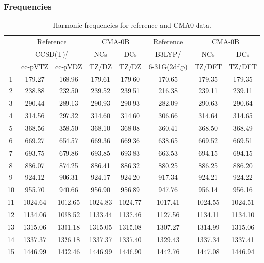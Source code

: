 \documentclass[10pt,oneside]{article}
\begin{document}
\subsubsection*{Frequencies}
\begin{table}[h!]
\centering
\caption{Harmonic frequencies for reference and CMA0 data.}
\begin{tabular}{cccccccc}
\toprule
{} & \multicolumn{2}{c}{Reference} & \multicolumn{2}{c}{CMA-0B} &    Reference & \multicolumn{2}{c}{CMA-0B} \\
{} & \multicolumn{2}{c}{CCSD(T)/} &     NCs &     DCs &       B3LYP/ &     NCs &     DCs \\
{} &   cc-pVTZ & cc-pVDZ &   TZ/DZ &   TZ/DZ & 6-31G(2df,p) &  TZ/DFT &  TZ/DFT \\
\midrule
1  &    179.27 &  168.96 &  179.61 &  179.60 &       170.65 &  179.35 &  179.35 \\
2  &    238.88 &  232.50 &  239.52 &  239.51 &       216.38 &  239.11 &  239.11 \\
3  &    290.44 &  289.13 &  290.93 &  290.93 &       282.09 &  290.63 &  290.64 \\
4  &    314.56 &  297.32 &  314.60 &  314.60 &       306.66 &  314.64 &  314.65 \\
5  &    368.56 &  358.50 &  368.10 &  368.08 &       360.41 &  368.50 &  368.49 \\
6  &    669.27 &  654.57 &  669.36 &  669.36 &       638.65 &  669.52 &  669.51 \\
7  &    693.75 &  679.86 &  693.85 &  693.83 &       663.53 &  694.15 &  694.15 \\
8  &    886.07 &  874.25 &  886.41 &  886.32 &       880.25 &  886.25 &  886.20 \\
9  &    924.12 &  906.31 &  924.17 &  924.20 &       917.34 &  924.21 &  924.22 \\
10 &    955.70 &  940.66 &  956.90 &  956.89 &       947.76 &  956.14 &  956.16 \\
11 &   1024.64 & 1012.65 & 1024.83 & 1024.77 &      1017.41 & 1024.55 & 1024.51 \\
12 &   1134.06 & 1088.52 & 1133.44 & 1133.46 &      1127.56 & 1134.11 & 1134.10 \\
13 &   1315.06 & 1301.18 & 1315.05 & 1315.08 &      1307.27 & 1314.99 & 1315.06 \\
14 &   1337.37 & 1326.18 & 1337.37 & 1337.40 &      1329.43 & 1337.34 & 1337.41 \\
15 &   1446.99 & 1432.46 & 1446.99 & 1446.90 &      1442.76 & 1447.08 & 1446.94 \\

\end{tabular}
\end{table}
\end{document}
